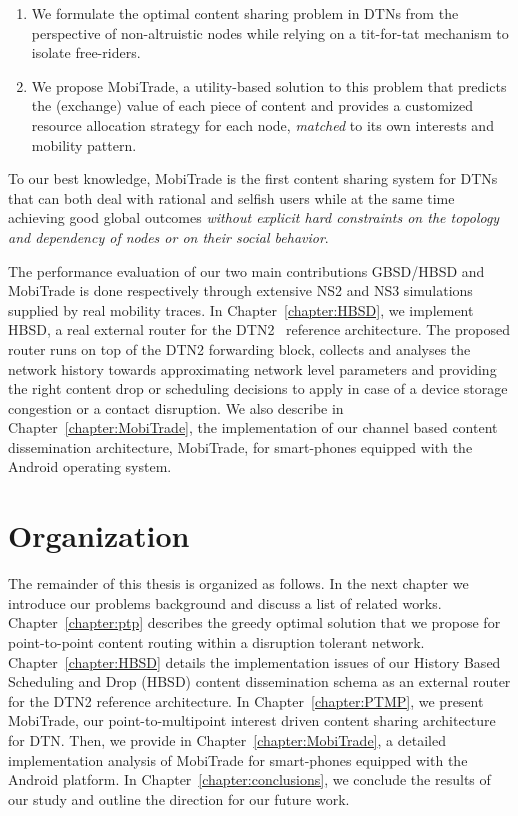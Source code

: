 \begin{enumerate}
    \item We formulate the optimal content sharing problem in DTNs from the perspective of non-altruistic nodes while relying on a tit-for-tat mechanism to isolate free-riders.
    \item We propose MobiTrade, a utility-based solution to this problem that predicts the (exchange) value of each piece of content and provides a customized resource allocation strategy for each node, \emph{matched} to its own interests and mobility pattern.
\end{enumerate}
To our best knowledge, MobiTrade is the first content sharing system for DTNs that can both deal with rational and selfish users while at the same time achieving good global outcomes \emph{without explicit hard constraints on the topology and dependency of nodes or on their social behavior}. 

The performance evaluation of our two main contributions GBSD/HBSD and MobiTrade is done respectively through extensive NS2 and NS3 simulations supplied by real mobility traces. In Chapter~\ref{chapter:HBSD}, we implement HBSD, a real external router for the DTN2~\cite{HBSDDTN2} reference architecture. The proposed router runs on top of the DTN2 forwarding block, collects and analyses the network history towards approximating network level parameters and providing the right content drop or scheduling decisions to apply in case of a device storage congestion or a contact disruption. We also describe in Chapter~\ref{chapter:MobiTrade}, the implementation of our channel based content dissemination architecture, MobiTrade, for smart-phones equipped with the Android operating system. 

\section*{Organization}

The remainder of this thesis is organized as follows. In the next chapter we introduce our problems background and discuss a list of related works. Chapter~\ref{chapter:ptp} describes the 
greedy optimal solution that we propose for point-to-point content routing within a disruption tolerant network. Chapter~\ref{chapter:HBSD} details the implementation issues of our History Based Scheduling and Drop (HBSD) content dissemination schema as an external router for the DTN2 reference architecture.  In Chapter~\ref{chapter:PTMP}, we present MobiTrade, our point-to-multipoint interest driven content sharing architecture for DTN. Then, we provide in Chapter~\ref{chapter:MobiTrade}, a detailed implementation analysis of MobiTrade for smart-phones equipped with the Android platform. In Chapter~\ref{chapter:conclusions}, we conclude the results of our
study and outline the direction for our future work.
